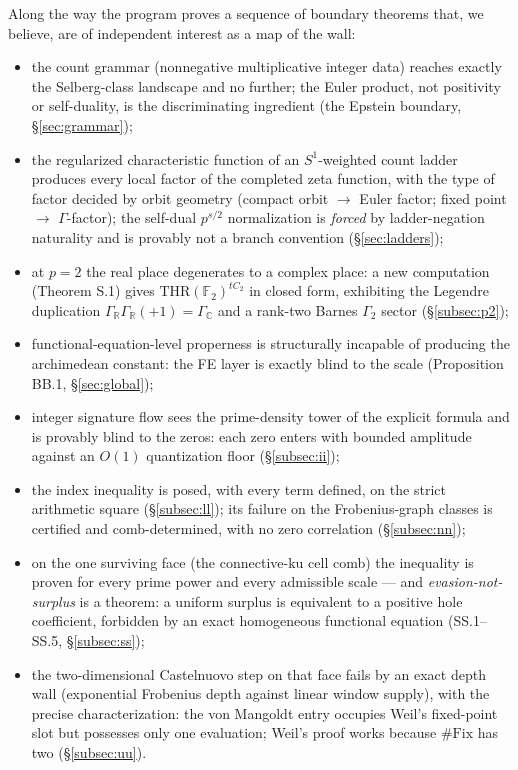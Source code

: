 \documentclass[11pt,reqno]{amsart}
\theoremstyle{plain}
\theoremstyle{definition}
\theoremstyle{remark}
\newcommand{\R}{\mathbb{R}}
\newcommand{\C}{\mathbb{C}}
\newcommand{\F}{\mathbb{F}}
\newcommand{\THR}{\mathrm{THR}}
\newcommand{\ku}{\mathrm{ku}}
\begin{document}
Along the way the program proves a sequence of boundary theorems that, we believe, are of
independent interest as a map of the wall:
\begin{itemize}
\item the count grammar (nonnegative multiplicative integer data) reaches exactly the
Selberg-class landscape and no further; the Euler product, not positivity or self-duality, is
the discriminating ingredient (the Epstein boundary, \S\ref{sec:grammar});
\item the regularized characteristic function of an $S^1$-weighted count ladder produces
every local factor of the completed zeta function, with the type of factor decided by orbit
geometry (compact orbit $\to$ Euler factor; fixed point $\to$ $\Gamma$-factor); the
self-dual $p^{s/2}$ normalization is \emph{forced} by ladder-negation naturality and is
provably not a branch convention (\S\ref{sec:ladders});
\item at $p = 2$ the real place degenerates to a complex place: a new computation
(Theorem S.1) gives $\THR(\F_2)^{tC_2}$ in closed form, exhibiting the Legendre duplication
$\Gamma_\R\Gamma_\R(+1) = \Gamma_\C$ and a rank-two Barnes $\Gamma_2$ sector
(\S\ref{subsec:p2});
\item functional-equation-level properness is structurally incapable of producing the
archimedean constant: the FE layer is exactly blind to the scale (Proposition BB.1,
\S\ref{sec:global});
\item integer signature flow sees the prime-density tower of the explicit formula and is
provably blind to the zeros: each zero enters with bounded amplitude against an $O(1)$
quantization floor (\S\ref{subsec:ii});
\item the index inequality is posed, with every term defined, on the strict arithmetic square
(\S\ref{subsec:ll}); its failure on the Frobenius-graph classes is certified and
comb-determined, with no zero correlation (\S\ref{subsec:nn});
\item on the one surviving face (the connective-$\ku$ cell comb) the inequality is proven for
every prime power and every admissible scale --- and \emph{evasion-not-surplus} is a theorem:
a uniform surplus is equivalent to a positive hole coefficient, forbidden by an exact
homogeneous functional equation (SS.1--SS.5, \S\ref{subsec:ss});
\item the two-dimensional Castelnuovo step on that face fails by an exact depth wall
(exponential Frobenius depth against linear window supply), with the precise
characterization: the von Mangoldt entry occupies Weil's fixed-point slot but possesses only
one evaluation; Weil's proof works because $\#\mathrm{Fix}$ has two (\S\ref{subsec:uu}).
\end{itemize}
\end{document}
